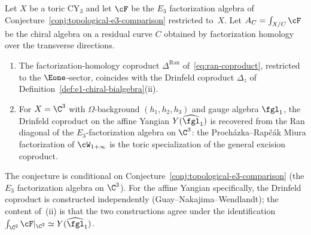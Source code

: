 \begin{conjecture}
\label{conj:fact-hom-vs-miura}
\ClaimStatusConjectured
Let $X$ be a toric CY$_3$ and let $\cF$ be the $E_3$
factorization algebra of
Conjecture~\textup{\ref{conj:topological-e3-comparison}} restricted
to~$X$. Let $A_C = \int_{X/C} \cF$ be the chiral algebra on a
residual curve $C$ obtained by factorization homology over the
transverse directions.
\begin{enumerate}[label=\textup{(\roman*)}]
 \item The factorization-homology coproduct
 $\Delta^{\mathrm{Ran}}$ of~\eqref{eq:ran-coproduct}, restricted to
 the $\Eone$-sector, coincides with the Drinfeld coproduct
 $\Delta_z$ of Definition~\textup{\ref{def:e1-chiral-bialgebra}}(ii).
 \item For $X = \C^3$ with $\Omega$-background $(h_1, h_2, h_3)$
 and gauge algebra $\fgl_1$, the Drinfeld coproduct on the affine
 Yangian $Y(\widehat{\fgl}_1)$ is recovered from the Ran diagonal
 of the $E_3$-factorization algebra on $\C^3$: the
 Proch\'azka--Rap\v{c}\'ak Miura factorization of
 $\cW_{1+\infty}$ is the toric specialization of the general
 excision coproduct.
\end{enumerate}
The conjecture is conditional on
Conjecture~\textup{\ref{conj:topological-e3-comparison}} (the
$E_3$ factorization algebra on $\C^3$). For the affine
Yangian specifically, the Drinfeld coproduct is constructed
independently (Guay--Nakajima--Wendlandt); the content of~(ii) is
that the two constructions agree under the identification
$\int_{\C^2} \cF|_{\C^2} \simeq Y(\widehat{\fgl}_1)$.
\end{conjecture}

